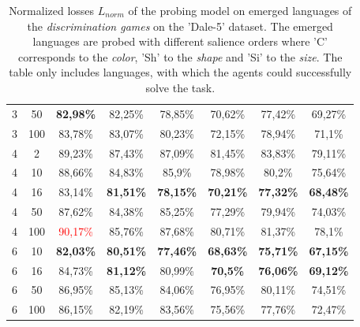 \begin{table}[ht]
\begin{tabular}{cc|c|c|c|c|c|c}
        {3} & {50}  & \textbf{82,98\%}         & {82,25\%}                & {78,85\%}                & {70,62\%}                & {77,42\%}            & {69,27\%}            \\
        {3} & {100} & {83,78\%}                & {83,07\%}                & {80,23\%}                & {72,15\%}                & {78,94\%}            & {71,1\%}             \\
        {4} & {2}   & {89,23\%}                & {87,43\%}                & {87,09\%}                & {81,45\%}                & {83,83\%}            & {79,11\%}            \\
        {4} & {10}  & {88,66\%}                & {84,83\%}                & {85,9\%}                 & {78,98\%}                & {80,2\%}             & {75,64\%}            \\
        {4} & {16}  & {83,14\%}                & \textbf{81,51\%}         & \textbf{78,15\%}         & \textbf{70,21\%}         & \textbf{77,32\%}     & \textbf{68,48\%}     \\
        {4} & {50}  & {87,62\%}                & {84,38\%}                & {85,25\%}                & {77,29\%}                & {79,94\%}            & {74,03\%}            \\
        {4} & {100} & \textcolor{red}{90,17\%} & {85,76\%}                & {87,68\%}                & {80,71\%}                & {81,37\%}            & {78,1\%}             \\
        {6} & {10}  & \textbf{82,03\%}         & \textbf{80,51\%}         & \textbf{77,46\%}         & \textbf{68,63\%}         & \textbf{75,71\%}     & \textbf{67,15\%}     \\
        {6} & {16}  & {84,73\%}                & \textbf{81,12\%}         & {80,99\%}                & \textbf{70,5\%}          & \textbf{76,06\%}     & \textbf{69,12\%}     \\
        {6} & {50}  & {86,95\%}                & {85,13\%}                & {84,06\%}                & {76,95\%}                & {80,11\%}            & {74,51\%}            \\
        {6} & {100} & {86,15\%}                & {82,19\%}                & {83,56\%}                & {75,56\%}                & {77,76\%}            & {72,47\%}            \\
        \bottomrule
    \end{tabular}
    \caption{Normalized losses $L_{norm}$ of the probing model on emerged languages of the \emph{discrimination games} on the 'Dale-5' dataset. The emerged languages are probed with different salience orders where 'C' corresponds to the \emph{color}, 'Sh' to the \emph{shape} and 'Si' to the \emph{size}. The table only includes languages, with which the agents could successfully solve the task.}
    \label{tab:probing:discriminator:dale-5}
\end{table}

